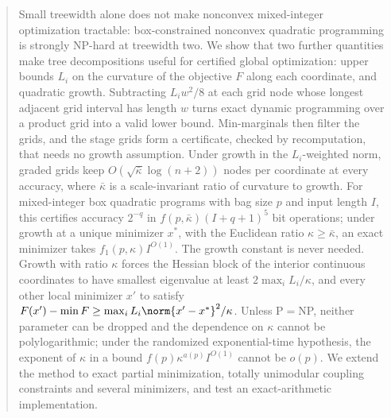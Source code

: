 \begin{abstract}
Small treewidth alone does not make nonconvex mixed-integer optimization
tractable: box-constrained nonconvex quadratic programming is strongly
NP-hard at treewidth two. We show that two further quantities make tree
decompositions useful for certified global optimization: upper bounds $L_i$
on the curvature of the objective $F$ along each coordinate, and quadratic
growth. Subtracting $L_iw^2/8$ at each grid node whose longest adjacent grid
interval has length $w$ turns exact dynamic programming over a product grid
into a valid lower bound. Min-marginals then filter the grids, and the stage
grids form a certificate, checked by recomputation, that needs no growth
assumption. Under growth in the $L_i$-weighted norm, graded grids keep
$O(\sqrt{\bar\kappa}\log(n+2))$ nodes per coordinate at every accuracy,
where $\bar\kappa$ is a scale-invariant ratio of curvature to growth. For
mixed-integer box quadratic programs with bag size $p$ and input length $I$,
this certifies accuracy $2^{-q}$ in $f(p,\bar\kappa)(I+q+1)^5$ bit
operations; under growth at a unique minimizer $x^*$, with the Euclidean
ratio $\kappa\ge\bar\kappa$, an exact minimizer takes
$f_1(p,\kappa)I^{O(1)}$. The growth constant is never needed. Growth with
ratio $\kappa$ forces the Hessian block of the interior continuous
coordinates to have smallest eigenvalue at least $2\max_iL_i/\kappa$, and
every other local minimizer $x'$ to satisfy
$F(x')-\min F\ge\max_iL_i\norm{x'-x^*}^2/\kappa$. Unless P${}={}$NP,
neither parameter can be dropped and the dependence on $\kappa$ cannot be polylogarithmic;
under the randomized exponential-time hypothesis, the exponent of $\kappa$
in a bound $f(p)\kappa^{a(p)}I^{O(1)}$ cannot be $o(p)$. We extend the
method to exact partial minimization, totally unimodular coupling
constraints and several minimizers, and test an exact-arithmetic
implementation.
\end{abstract}
